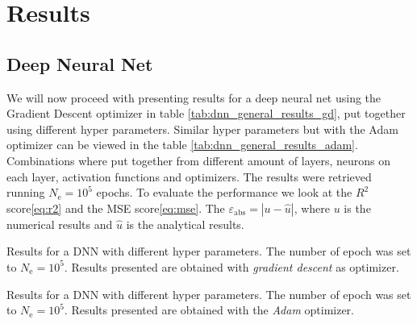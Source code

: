 \section{Results}
\subsection{Deep Neural Net}
We will now proceed with presenting results for a deep neural net using the Gradient Descent optimizer in table \ref{tab:dnn_general_results_gd}, put together using different hyper parameters. Similar hyper parameters but with the Adam optimizer can be viewed in the table \ref{tab:dnn_general_results_adam}. Combinations where put together from different amount of layers, neurons on each layer, activation functions and optimizers. The results were retrieved running $N_\mathrm{e}=10^5$ epochs. To evaluate the performance we look at the $R^2$ score\eqref{eq:r2} and the MSE score\eqref{eq:mse}. The $\varepsilon_{\mathrm{abs}}=|u - \hat{u}|$, where $u$ is the numerical results and $\hat{u}$ is the analytical results.
\begin{table}[h!tb]
    \centering
    \caption{Results for a DNN with different hyper parameters. The number of epoch was set to $N_\mathrm{e}=10^5$. Results presented are obtained with \textit{gradient descent} as optimizer.}
    \label{tab:dnn_general_results_gd}
\end{table}

\begin{table}[h!tb]
    \centering
    \caption{Results for a DNN with different hyper parameters. The number of epoch was set to $N_\mathrm{e}=10^5$. Results presented are obtained with the \textit{Adam} optimizer\cite{kingma_adam:_2014}.}
    \label{tab:dnn_general_results_adam}
\end{table}


